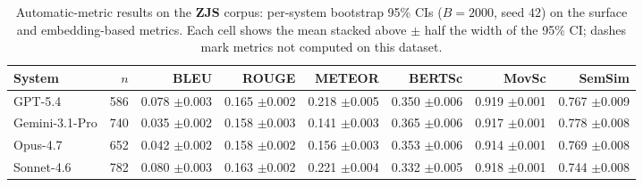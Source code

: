 \begin{table}[t]
\centering\footnotesize
\caption{Automatic-metric results on the \textbf{ZJS} corpus: per-system bootstrap 95\% CIs ($B=2000$, seed $42$) on the surface and embedding-based metrics. Each cell shows the mean stacked above $\pm$ half the width of the 95\% CI; dashes mark metrics not computed on this dataset.}
\label{tbl-full-results-auto-zjs}
\setlength{\tabcolsep}{4pt}
\begin{tabular*}{\textwidth}{@{\extracolsep{\fill}}lrrrrrrr@{}}
\toprule
System & $n$ & BLEU & ROUGE & METEOR & BERTSc & MovSc & SemSim \\
\midrule
GPT-5.4 & 586 & \shortstack[r]{0.078\\{\scriptsize $\pm$0.003}} & \shortstack[r]{0.165\\{\scriptsize $\pm$0.002}} & \shortstack[r]{0.218\\{\scriptsize $\pm$0.005}} & \shortstack[r]{0.350\\{\scriptsize $\pm$0.006}} & \shortstack[r]{0.919\\{\scriptsize $\pm$0.001}} & \shortstack[r]{0.767\\{\scriptsize $\pm$0.009}} \\
Gemini-3.1-Pro & 740 & \shortstack[r]{0.035\\{\scriptsize $\pm$0.002}} & \shortstack[r]{0.158\\{\scriptsize $\pm$0.003}} & \shortstack[r]{0.141\\{\scriptsize $\pm$0.003}} & \shortstack[r]{0.365\\{\scriptsize $\pm$0.006}} & \shortstack[r]{0.917\\{\scriptsize $\pm$0.001}} & \shortstack[r]{0.778\\{\scriptsize $\pm$0.008}} \\
Opus-4.7 & 652 & \shortstack[r]{0.042\\{\scriptsize $\pm$0.002}} & \shortstack[r]{0.158\\{\scriptsize $\pm$0.002}} & \shortstack[r]{0.156\\{\scriptsize $\pm$0.003}} & \shortstack[r]{0.353\\{\scriptsize $\pm$0.006}} & \shortstack[r]{0.914\\{\scriptsize $\pm$0.001}} & \shortstack[r]{0.769\\{\scriptsize $\pm$0.008}} \\
Sonnet-4.6 & 782 & \shortstack[r]{0.080\\{\scriptsize $\pm$0.003}} & \shortstack[r]{0.163\\{\scriptsize $\pm$0.002}} & \shortstack[r]{0.221\\{\scriptsize $\pm$0.004}} & \shortstack[r]{0.332\\{\scriptsize $\pm$0.005}} & \shortstack[r]{0.918\\{\scriptsize $\pm$0.001}} & \shortstack[r]{0.744\\{\scriptsize $\pm$0.008}} \\

\end{tabular*}
\end{table}
